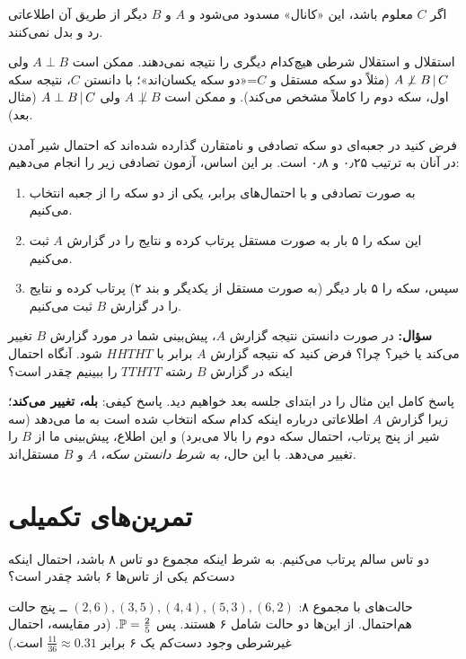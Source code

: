 اگر $C$ معلوم باشد، این «کانال» مسدود می‌شود و $A$ و $B$ دیگر از طریق آن اطلاعاتی رد و بدل نمی‌کنند.

\begin{warning}
\warntitle استقلال و استقلال شرطی هیچ‌کدام دیگری را نتیجه نمی‌دهند. ممکن است $A\perp B$ ولی $A\not\perp B\,|\, C$ (مثلاً دو سکه مستقل و $C$=«دو سکه یکسان‌اند»؛ با دانستن $C$، نتیجه سکه اول، سکه دوم را کاملاً مشخص می‌کند). و ممکن است $A\not\perp B$ ولی $A\perp B\,|\, C$ (مثال بعد).
\end{warning}

\begin{example}\label{ex:twocoins}
فرض کنید در جعبه‌ای دو سکه تصادفی و نامتقارن گذارده شده‌اند که احتمال شیر آمدن در آنان به ترتیب ۰٫۲۵ و ۰٫۸ است. بر این اساس، آزمون تصادفی زیر را انجام می‌دهیم:
\begin{enumerate}
\item به صورت تصادفی و با احتمال‌های برابر، یکی از دو سکه را از جعبه انتخاب می‌کنیم.
\item این سکه را ۵ بار به صورت مستقل پرتاب کرده و نتایج را در گزارش $A$ ثبت می‌کنیم.
\item سپس، سکه را ۵ بار دیگر (به صورت مستقل از یکدیگر و بند ۲) پرتاب کرده و نتایج را در گزارش $B$ ثبت می‌کنیم.
\end{enumerate}
\textbf{سؤال:} در صورت دانستن نتیجه گزارش $A$، پیش‌بینی شما در مورد گزارش $B$ تغییر می‌کند یا خیر؟ چرا؟ فرض کنید که نتیجه گزارش $A$ برابر با $HHTHT$ شود. آنگاه احتمال اینکه در گزارش $B$ رشته $TTHTT$ را ببینیم چقدر است؟
\end{example}

پاسخ کامل این مثال را در ابتدای جلسه بعد خواهیم دید. پاسخ کیفی: \textbf{بله، تغییر می‌کند}؛ زیرا گزارش $A$ اطلاعاتی درباره اینکه کدام سکه انتخاب شده است به ما می‌دهد (سه شیر از پنج پرتاب، احتمال سکه دوم را بالا می‌برد) و این اطلاع، پیش‌بینی ما از $B$ را تغییر می‌دهد. با این حال، \emph{به شرط دانستن سکه}، $A$ و $B$ مستقل‌اند.

\section{تمرین‌های تکمیلی}

\begin{exercise}
دو تاس سالم پرتاب می‌کنیم. به شرط اینکه مجموع دو تاس ۸ باشد، احتمال اینکه دست‌کم یکی از تاس‌ها ۶ باشد چقدر است؟
\end{exercise}
\begin{solution}
حالت‌های با مجموع ۸: $(2,6),(3,5),(4,4),(5,3),(6,2)$ ــ پنج حالت هم‌احتمال. از این‌ها دو حالت شامل ۶ هستند. پس $\mathbb{P}=\frac25$. (در مقایسه، احتمال غیرشرطی وجود دست‌کم یک ۶ برابر $\frac{11}{36}\approx0.31$ است.)
\end{solution}

